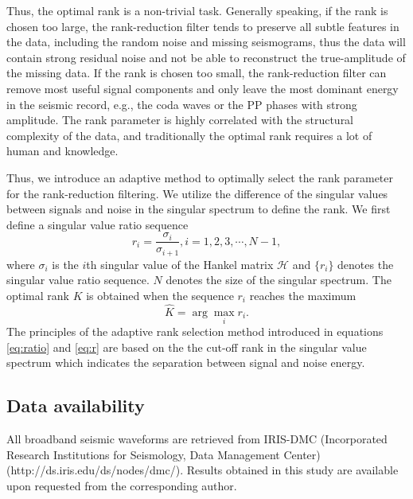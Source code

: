 Thus,  the optimal rank is a non-trivial task. Generally speaking, if the rank is chosen too large, the rank-reduction filter tends to preserve all subtle features in the data, including the random noise and missing seismograms, thus the  data will contain strong residual noise and not be able to reconstruct the true-amplitude of the missing data. If the rank is chosen too small, the rank-reduction filter can remove most useful signal components and only leave the most dominant energy in the seismic record, e.g., the coda waves or the PP phases with strong amplitude. The rank parameter is highly correlated with the structural complexity of the data, and traditionally the optimal rank requires a lot of human  and  knowledge. 

Thus, we introduce an adaptive method to optimally select the rank parameter for the rank-reduction filtering. We utilize the difference of the singular values between signals and noise in the singular spectrum to define the rank. We first define a singular value ratio sequence
\begin{equation}
\label{eq:ratio}
r_i = \frac{\sigma_i}{\sigma_{i+1}}, i=1,2,3,\cdots,N-1,
\end{equation}
where $\sigma_i$ is the $i$th singular value of the Hankel matrix $\mathcal{H}$ and $\{r_i\}$ denotes the singular value ratio sequence. $N$ denotes the size of the singular spectrum. The optimal rank $K$ is obtained when the sequence $r_i$ reaches the maximum
\begin{equation}
\label{eq:r}
\hat{K} = \arg \max_{i} r_i.
\end{equation} 
The principles of the adaptive rank selection method introduced in equations \ref{eq:ratio} and \ref{eq:r} are based on the the cut-off rank in the singular value spectrum which indicates the separation between signal and noise energy.

\subsection*{Data availability}
All broadband seismic waveforms are retrieved from IRIS-DMC (Incorporated Research Institutions for Seismology, Data Management Center) (http://ds.iris.edu/ds/nodes/dmc/). Results obtained in this study are available upon requested from the corresponding author.



